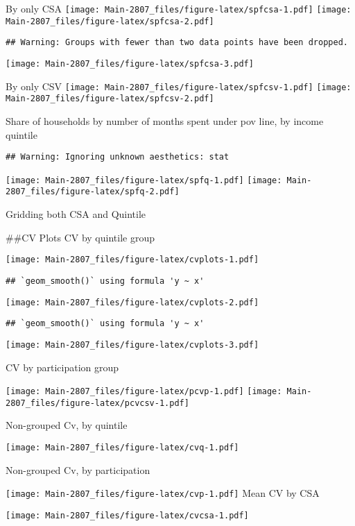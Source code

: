 \documentclass[
]{article}
\begin{document}
By only CSA \texttt{[image: Main-2807\_files/figure-latex/spfcsa-1.pdf]}
\texttt{[image: Main-2807\_files/figure-latex/spfcsa-2.pdf]}

\begin{verbatim}
## Warning: Groups with fewer than two data points have been dropped.
\end{verbatim}

\texttt{[image: Main-2807\_files/figure-latex/spfcsa-3.pdf]}

By only CSV \texttt{[image: Main-2807\_files/figure-latex/spfcsv-1.pdf]}
\texttt{[image: Main-2807\_files/figure-latex/spfcsv-2.pdf]}

Share of households by number of months spent under pov line, by income
quintile

\begin{verbatim}
## Warning: Ignoring unknown aesthetics: stat
\end{verbatim}

\texttt{[image: Main-2807\_files/figure-latex/spfq-1.pdf]}
\texttt{[image: Main-2807\_files/figure-latex/spfq-2.pdf]}

Gridding both CSA and Quintile

\#\#CV Plots CV by quintile group

\texttt{[image: Main-2807\_files/figure-latex/cvplots-1.pdf]}

\begin{verbatim}
## `geom_smooth()` using formula 'y ~ x'
\end{verbatim}

\texttt{[image: Main-2807\_files/figure-latex/cvplots-2.pdf]}

\begin{verbatim}
## `geom_smooth()` using formula 'y ~ x'
\end{verbatim}

\texttt{[image: Main-2807\_files/figure-latex/cvplots-3.pdf]}

CV by participation group

\texttt{[image: Main-2807\_files/figure-latex/pcvp-1.pdf]}
\texttt{[image: Main-2807\_files/figure-latex/pcvcsv-1.pdf]}

Non-grouped Cv, by quintile

\texttt{[image: Main-2807\_files/figure-latex/cvq-1.pdf]}

Non-grouped Cv, by participation

\texttt{[image: Main-2807\_files/figure-latex/cvp-1.pdf]} Mean CV by CSA

\texttt{[image: Main-2807\_files/figure-latex/cvcsa-1.pdf]}
\end{document}

